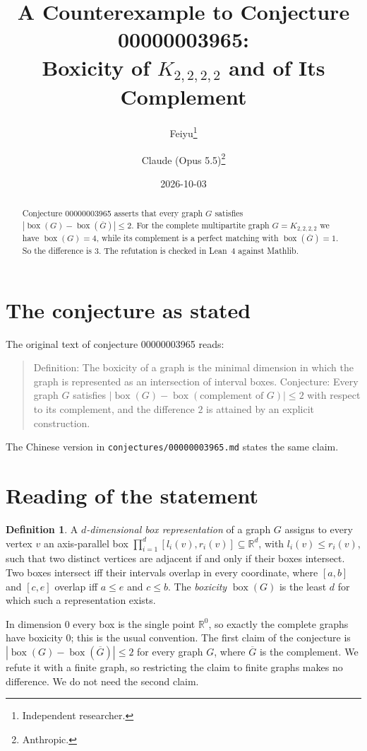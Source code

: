 \documentclass[11pt]{article}
\title{A Counterexample to Conjecture 00000003965:\\
Boxicity of $K_{2,2,2,2}$ and of Its Complement}
\author{%
  Feiyu\thanks{Independent researcher.}
  \and
  Claude (Opus 5.5)\thanks{Anthropic.}%
}
\date{2026-10-03}
\theoremstyle{plain}
\theoremstyle{definition}
\newtheorem{definition}[theorem]{Definition}
\theoremstyle{remark}
\newcommand{\bx}{\operatorname{box}}
\newcommand{\R}{\mathbb R}
\begin{document}
\maketitle

\begin{abstract}
Conjecture 00000003965 asserts that every graph $G$ satisfies
$|\bx(G)-\bx(\overline G)|\le2$. For the complete multipartite graph
$G=K_{2,2,2,2}$ we have $\bx(G)=4$, while its complement is a perfect matching with
$\bx(\overline G)=1$. So the difference is $3$. The refutation is checked in Lean~4
against Mathlib.
\end{abstract}

\section{The conjecture as stated}

The original text of conjecture 00000003965 reads:

\begin{quote}
Definition: The boxicity of a graph is the minimal dimension in which the graph is
represented as an intersection of interval boxes. Conjecture: Every graph $G$
satisfies $|\bx(G) - \bx(\text{complement of } G)| \le 2$ with respect to its
complement, and the difference $2$ is attained by an explicit construction.
\end{quote}

The Chinese version in \texttt{conjectures/00000003965.md} states the same claim.

\section{Reading of the statement}

\begin{definition}
A \emph{$d$-dimensional box representation} of a graph $G$ assigns to every vertex
$v$ an axis-parallel box $\prod_{i=1}^d[l_i(v),r_i(v)]\subseteq\R^d$, with
$l_i(v)\le r_i(v)$, such that two distinct vertices are adjacent if and only if their
boxes intersect. Two boxes intersect iff their intervals overlap in every coordinate,
where $[a,b]$ and $[c,e]$ overlap iff $a\le e$ and $c\le b$. The \emph{boxicity}
$\bx(G)$ is the least $d$ for which such a representation exists.
\end{definition}

In dimension $0$ every box is the single point $\R^0$, so exactly the complete graphs
have boxicity $0$; this is the usual convention. The first claim of the conjecture is
$|\bx(G)-\bx(\overline G)|\le2$ for every graph $G$, where $\overline G$ is the
complement. We refute it with a finite graph, so restricting the claim to finite
graphs makes no difference. We do not need the second claim.
\end{document}
